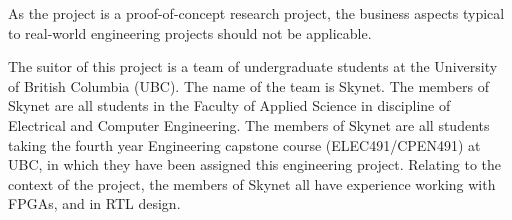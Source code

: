 As the project is a proof-of-concept research project, the business aspects 
typical to real-world engineering projects should not be applicable.

The suitor of this project is a team of undergraduate students at the University of British Columbia (UBC). The name of the team is Skynet. The members of Skynet are all students in the Faculty 
of Applied Science in discipline of Electrical and Computer Engineering. The members of Skynet are all students taking the fourth year Engineering capstone course (ELEC491/CPEN491) at UBC, in which they have been assigned this engineering project. Relating to the context of the project, the members of Skynet all have experience working with FPGAs, and in RTL design.